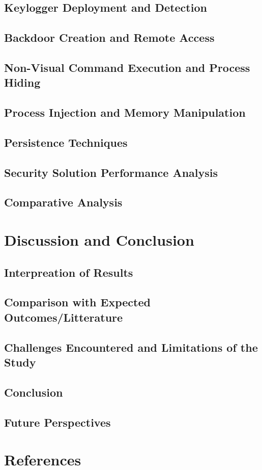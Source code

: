 \documentclass[11pt]{article}
\begin{document}
			\subsection{Keylogger Deployment and Detection}
			\subsection{Backdoor Creation and Remote Access}
			\subsection{Non-Visual Command Execution and Process Hiding}
			\subsection{Process Injection and Memory Manipulation}
			\subsection{Persistence Techniques}
			\subsection{Security Solution Performance Analysis}
			\subsection{Comparative Analysis}
			
		\section{Discussion and Conclusion}
			\subsection{Interpreation of Results}
			\subsection{Comparison with Expected Outcomes/Litterature}
			\subsection{Challenges Encountered and Limitations of the Study}
			\subsection{Conclusion}
			\subsection{Future Perspectives}
			
		\section{References}
		
	
\end{document}
